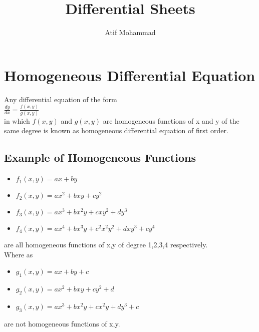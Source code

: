 \documentclass{article}
\title{Differential Sheets}
\author{Atif Mohammad}
\begin{document}
\tableofcontents
\maketitle
\section{Homogeneous Differential Equation}
Any differential equation of the form\\
$\frac{dy}{dx}=\frac{\displaystyle f(x,y)}{g(x,y)}$\\
in which $f(x,y)$ and $g(x,y)$ are homogeneous functions of x and y of the same degree is known as homogeneous differential equation of first order.
\subsection{Example of Homogeneous Functions}
\begin{itemize}
\item $f_1(x,y)=ax+by$
\item $f_2(x,y)=ax^2+bxy+cy^2$
\item $f_3(x,y)=ax^3+bx^2y+cxy^2+dy^3$
\item $f_4(x,y)=ax^4+bx^3y+c^2x^2y^2+dxy^3+cy^4$
\end{itemize}
are all homogeneous functions of x,y of degree 1,2,3,4 respectively.\\
Where as
\begin{itemize}
\item $g_1(x,y)=ax+by+c$
\item $g_2(x,y)=ax^2+bxy+cy^2+d$
\item $g_3(x,y)=ax^3+bx^2y+cx^2y+dy^3+c$
\end{itemize}
are not homogeneous functions of x,y.
\end{document}
